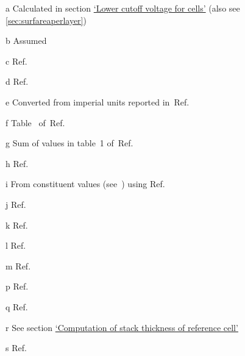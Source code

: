 \begin{table}[!htbp]
\begin{threeparttable}
        \smallskip
        \vspace*{-5pt}
        \begin{tablenotes}
            \begin{footnotesize}
            \item[a] Calculated in section \hyperlink{celllowercutoff}{`Lower cutoff voltage for cells'} (also see \cref{sec:surfareaperlayer})
            \item[b] Assumed
            \item[c] Ref.~\cite{Sae2010}
            \item[d] Ref.~\cite{Kizilel2009}
            \item[e] Converted from imperial units reported in~Ref.~\cite{GMBoltBatteryDims}
		    \item[f] Table~ of~Ref.~\cite{Groger2015} \\
            \item[g] Sum of values in table~1 of~Ref.~\cite{Svens2013}
            \item[h] Ref.~\cite{Chen2005}
            \item[i] From constituent values (see~\cite{Svens2013}) using Ref.~\cite{martienssen2006springer} \\
            \item[j] Ref.~\cite{Guo2010}
            \item[k] Ref.~\cite{Jeon2011}
            \item[l] Ref.~\cite{Worwood2017,Song2000}
            \item[m] Ref.~\cite{Kim2009}
            \item[p] Ref.~\cite{Northrop2011}
            \item[q] Ref.~\cite{Subramanian2009} \\
            \item[r] See section \hyperlink{stackthickness}{`Computation of stack thickness of reference cell'}
            \item[s] Ref.~\cite{Subramanian2009}
            \end{footnotesize}
        \end{tablenotes}
    \end{threeparttable}
\end{table}

